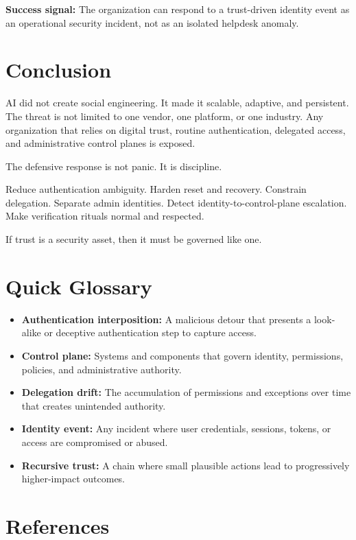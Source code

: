 \documentclass[11pt]{article}
\begin{document}
\textbf{Success signal:}
The organization can respond to a trust-driven identity event as an operational security incident, not as an isolated helpdesk anomaly.

\section{Conclusion}

AI did not create social engineering. It made it scalable, adaptive, and persistent. The threat is not limited to one vendor, one platform, or one industry. Any organization that relies on digital trust, routine authentication, delegated access, and administrative control planes is exposed.

The defensive response is not panic. It is discipline.

Reduce authentication ambiguity. Harden reset and recovery. Constrain delegation. Separate admin identities. Detect identity-to-control-plane escalation. Make verification rituals normal and respected.

If trust is a security asset, then it must be governed like one.

\clearpage
\appendix

\section{Quick Glossary}

\begin{itemize}[leftmargin=1.5em]
    \item \textbf{Authentication interposition:} A malicious detour that presents a look-alike or deceptive authentication step to capture access.
    \item \textbf{Control plane:} Systems and components that govern identity, permissions, policies, and administrative authority.
    \item \textbf{Delegation drift:} The accumulation of permissions and exceptions over time that creates unintended authority.
    \item \textbf{Identity event:} Any incident where user credentials, sessions, tokens, or access are compromised or abused.
    \item \textbf{Recursive trust:} A chain where small plausible actions lead to progressively higher-impact outcomes.
\end{itemize}

\clearpage
\section{References}
\end{document}
